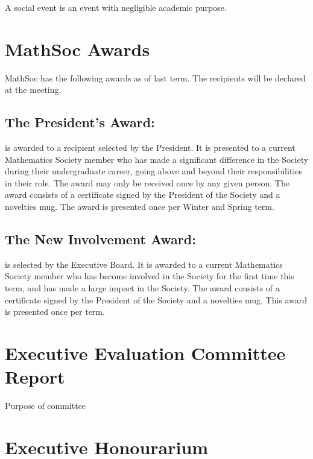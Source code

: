 \documentclass[12pt, letterpaper]{article}
\begin{document}
A social event is an event with negligible academic purpose.

\newpage
{}
\section*{MathSoc Awards}
MathSoc has the following awards as of last term. The recipients will be declared at the meeting.

\subsection*{The President’s Award:} 
is awarded to a recipient selected by the President. It is presented to a current Mathematics Society member who has made a significant difference in the Society during their undergraduate career, going above and beyond their responsibilities in their role. The award may only be received once by any given person. The award consists of a certificate signed by the President of the Society and a novelties mug. The award is presented once per Winter and Spring term.


\subsection*{The New Involvement Award:} 
is selected by the Executive Board. It is awarded to a current Mathematics Society member who has become involved in the Society for the first time this term, and has made a large impact in the Society. The award consists of a certificate signed by the President of the Society and a novelties mug. This award is presented once per term.

\newpage
{}
\section*{Executive Evaluation Committee Report}
Purpose of committee

\newpage
{}
\section*{Executive Honourarium}
\end{document}
